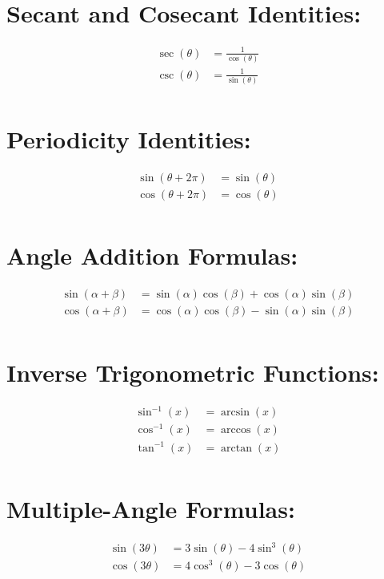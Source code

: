 \documentclass[twocolumn]{article}
\begin{document}
\section*{Secant and Cosecant Identities:}
\begin{align*}
    \sec(\theta) &= \frac{1}{\cos(\theta)} \\
    \csc(\theta) &= \frac{1}{\sin(\theta)} \\
\end{align*}

\section*{Periodicity Identities:}
\begin{align*}
    \sin(\theta + 2\pi) &= \sin(\theta) \\
    \cos(\theta + 2\pi) &= \cos(\theta) \\
\end{align*}

\section*{Angle Addition Formulas:}
\begin{align*}
    \sin(\alpha + \beta) &= \sin(\alpha)\cos(\beta) + \cos(\alpha)\sin(\beta) \\
    \cos(\alpha + \beta) &= \cos(\alpha)\cos(\beta) - \sin(\alpha)\sin(\beta) \\
\end{align*}

\section*{Inverse Trigonometric Functions:}
\begin{align*}
    \sin^{-1}(x) &= \arcsin(x) \\
    \cos^{-1}(x) &= \arccos(x) \\
    \tan^{-1}(x) &= \arctan(x) \\
\end{align*}

\section*{Multiple-Angle Formulas:}
\begin{align*}
    \sin(3\theta) &= 3\sin(\theta) - 4\sin^3(\theta) \\
    \cos(3\theta) &= 4\cos^3(\theta) - 3\cos(\theta) \\
\end{align*}
\end{document}
